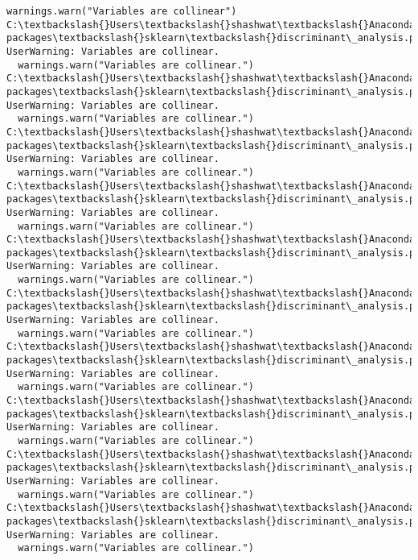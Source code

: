 \documentclass[11pt]{article}
\begin{document}
\begin{Verbatim}[commandchars=\\\{\}]
  warnings.warn("Variables are collinear")
C:\textbackslash{}Users\textbackslash{}shashwat\textbackslash{}Anaconda3\textbackslash{}lib\textbackslash{}site-packages\textbackslash{}sklearn\textbackslash{}discriminant\_analysis.py:388: UserWarning: Variables are collinear.
  warnings.warn("Variables are collinear.")
C:\textbackslash{}Users\textbackslash{}shashwat\textbackslash{}Anaconda3\textbackslash{}lib\textbackslash{}site-packages\textbackslash{}sklearn\textbackslash{}discriminant\_analysis.py:388: UserWarning: Variables are collinear.
  warnings.warn("Variables are collinear.")
C:\textbackslash{}Users\textbackslash{}shashwat\textbackslash{}Anaconda3\textbackslash{}lib\textbackslash{}site-packages\textbackslash{}sklearn\textbackslash{}discriminant\_analysis.py:388: UserWarning: Variables are collinear.
  warnings.warn("Variables are collinear.")
C:\textbackslash{}Users\textbackslash{}shashwat\textbackslash{}Anaconda3\textbackslash{}lib\textbackslash{}site-packages\textbackslash{}sklearn\textbackslash{}discriminant\_analysis.py:388: UserWarning: Variables are collinear.
  warnings.warn("Variables are collinear.")
C:\textbackslash{}Users\textbackslash{}shashwat\textbackslash{}Anaconda3\textbackslash{}lib\textbackslash{}site-packages\textbackslash{}sklearn\textbackslash{}discriminant\_analysis.py:388: UserWarning: Variables are collinear.
  warnings.warn("Variables are collinear.")
C:\textbackslash{}Users\textbackslash{}shashwat\textbackslash{}Anaconda3\textbackslash{}lib\textbackslash{}site-packages\textbackslash{}sklearn\textbackslash{}discriminant\_analysis.py:388: UserWarning: Variables are collinear.
  warnings.warn("Variables are collinear.")
C:\textbackslash{}Users\textbackslash{}shashwat\textbackslash{}Anaconda3\textbackslash{}lib\textbackslash{}site-packages\textbackslash{}sklearn\textbackslash{}discriminant\_analysis.py:388: UserWarning: Variables are collinear.
  warnings.warn("Variables are collinear.")
C:\textbackslash{}Users\textbackslash{}shashwat\textbackslash{}Anaconda3\textbackslash{}lib\textbackslash{}site-packages\textbackslash{}sklearn\textbackslash{}discriminant\_analysis.py:388: UserWarning: Variables are collinear.
  warnings.warn("Variables are collinear.")
C:\textbackslash{}Users\textbackslash{}shashwat\textbackslash{}Anaconda3\textbackslash{}lib\textbackslash{}site-packages\textbackslash{}sklearn\textbackslash{}discriminant\_analysis.py:388: UserWarning: Variables are collinear.
  warnings.warn("Variables are collinear.")
C:\textbackslash{}Users\textbackslash{}shashwat\textbackslash{}Anaconda3\textbackslash{}lib\textbackslash{}site-packages\textbackslash{}sklearn\textbackslash{}discriminant\_analysis.py:388: UserWarning: Variables are collinear.
  warnings.warn("Variables are collinear.")

    \end{Verbatim}
\end{document}
